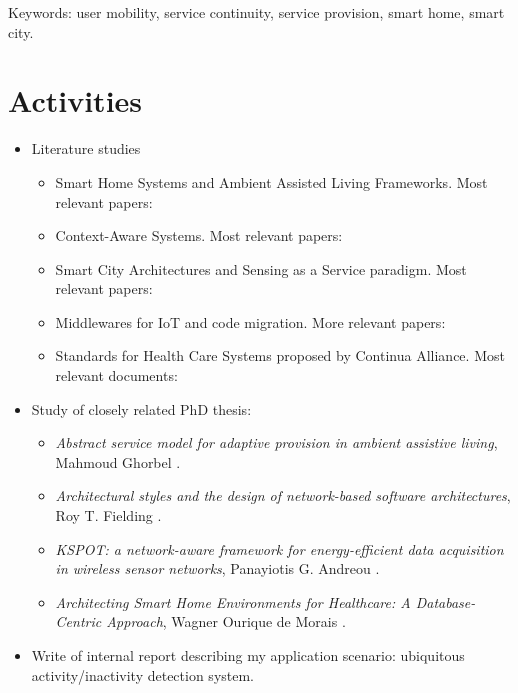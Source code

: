 \documentclass[]{report}
\begin{document}
Keywords: user mobility, service continuity, service provision, smart home, smart city.

\section*{Activities} 

\begin{itemize}
	\item Literature studies
	\begin{itemize}
		\item Smart Home Systems and Ambient Assisted Living Frameworks. Most relevant papers: \cite{acampora2013survey,blackman2016ambient,memon2014ambient,alam2012review}
		\item Context-Aware Systems. Most relevant papers: \cite{henricksen2005middleware,perera2014context}
		\item Smart City Architectures and Sensing as a Service paradigm. Most relevant papers: \cite{perera2014sensing,perera2014sensor,sheng2013sensing,zaslavsky2013sensing}
		\item Middlewares for IoT and code migration. More relevant papers: \cite{razzaque2016middleware,yu2013application,raychoudhury2013middleware}
		\item Standards for Health Care Systems proposed by Continua Alliance. Most relevant documents: \cite{schreier2014internet,rickardsson2016patient,clarke2007developing}
	\end{itemize}
	\item Study of closely related PhD thesis:
	\begin{itemize}
		\item \textit{Abstract service model for adaptive provision in ambient assistive living},  Mahmoud Ghorbel \cite{ghorbel2008abstract}.
		\item \textit{Architectural styles and the design of network-based software architectures}, Roy T. Fielding \cite{fielding2000architectural}.
		\item \textit{KSPOT: a network-aware framework for energy-efficient data acquisition in wireless sensor networks}, Panayiotis G. Andreou \cite{andreou2011kspot}.
		\item \textit{Architecting Smart Home Environments for Healthcare: A Database-Centric Approach}, Wagner Ourique de Morais \cite{ourique2015architecting}. 
	\end{itemize}
	\item Write of internal report describing my application scenario: ubiquitous activity/inactivity detection system.

\end{itemize}
\end{document}
